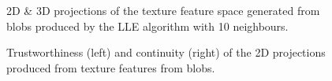 \begin{figure}[H]
	\centering
	\caption{2D \& 3D projections of the texture feature space generated from blobs produced by the LLE algorithm with 10 neighbours.}\label{fig:texture_LLE_mapping}
\end{figure}
\clearpage


\clearpage
\begin{figure}[H]
	\centering
	\caption{Trustworthiness (left) and continuity (right) of the 2D projections produced from texture features from blobs.}\label{fig:TC_2d_texture}
\end{figure}

